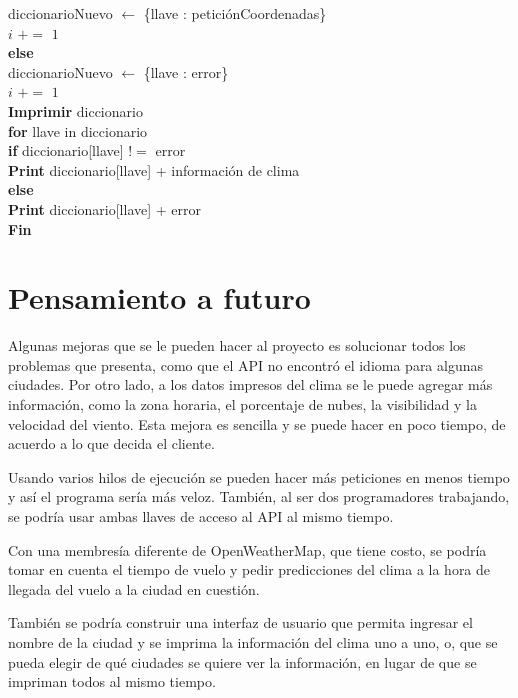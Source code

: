 \documentclass[]{article}
\begin{document}
\indent\indent\indent\indent diccionarioNuevo $ \leftarrow $ \{llave :
peticiónCoordenadas\}\\
\indent\indent\indent\indent $ i $ $ += $ $ 1 $\\
\indent\indent\indent \textbf{else}\\
\indent\indent\indent\indent diccionarioNuevo $ \leftarrow $ \{llave : error\}
\\
\indent\indent\indent\indent $ i $ $ += $ $ 1 $\\
\indent\textbf{Imprimir} diccionario\\
\indent\indent \textbf{for} llave in diccionario\\
\indent\indent\indent \textbf{if} diccionario[llave] $ != $ error\\
\indent\indent\indent\indent \textbf{Print} diccionario[llave] + información
de clima\\
\indent\indent\indent \textbf{else}\\
\indent\indent\indent\indent \textbf{Print} diccionario[llave] + error\\
\textbf{Fin}

\section{Pensamiento a futuro}
Algunas mejoras que se le pueden hacer al proyecto es solucionar todos los
problemas que presenta, como que el API no encontró el idioma para algunas
ciudades. Por otro lado, a los datos impresos del clima se le puede agregar
más información, como la zona horaria, el porcentaje de nubes, la visibilidad
y la velocidad del viento. Esta mejora es sencilla y se puede hacer en poco
tiempo, de acuerdo a lo que decida el cliente.

Usando varios hilos de ejecución se pueden hacer más peticiones en menos
tiempo y así el programa sería más veloz. También, al ser dos
programadores trabajando, se podría usar ambas llaves de acceso al API al
mismo tiempo.

Con una membresía diferente de OpenWeatherMap, que tiene costo, se
podría tomar en cuenta el tiempo de vuelo y pedir predicciones del clima a la
hora de llegada del vuelo a la ciudad en cuestión.

También se podría construir una interfaz de usuario que permita ingresar
el nombre de la ciudad y se imprima la información del clima uno a uno, o,
que se pueda elegir de qué ciudades se quiere ver la información, en lugar de
que se impriman todos al mismo tiempo.
\end{document}
